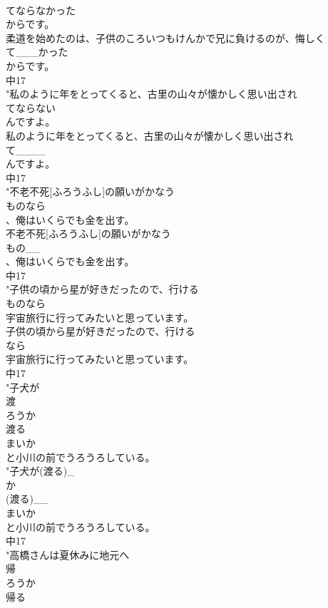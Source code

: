 \documentclass[8pt]{extreport}
\begin{document}
\begin{CJK}{UTF8}{min}
\\	てならなかった
\\	からです。
\\	柔道を始めたのは、子供のころいつもけんかで兄に負けるのが、悔しく
\\	て___かった
\\	からです。
\\	中17
\\	"私のように年をとってくると、古里の山々が懐かしく思い出され
\\	てならない
\\	んですよ。
\\	私のように年をとってくると、古里の山々が懐かしく思い出され
\\	て____
\\	んですよ。
\\	中17
\\	"不老不死[ふろうふし]の願いがかなう
\\	ものなら
\\	、俺はいくらでも金を出す。
\\	不老不死[ふろうふし]の願いがかなう
\\	もの__
\\	、俺はいくらでも金を出す。
\\	中17
\\	"子供の頃から星が好きだったので、行ける
\\	ものなら
\\	宇宙旅行に行ってみたいと思っています。
\\	子供の頃から星が好きだったので、行ける
\\	なら
\\	宇宙旅行に行ってみたいと思っています。
\\	中17
\\	"子犬が
\\	渡
\\	ろうか
\\	渡る
\\	まいか
\\	と小川の前でうろうろしている。
\\	"子犬が(渡る)_
\\	か
\\	(渡る)__
\\	まいか
\\	と小川の前でうろうろしている。
\\	中17
\\	"高橋さんは夏休みに地元へ
\\	帰
\\	ろうか
\\	帰る

\end{CJK}
\end{document}
